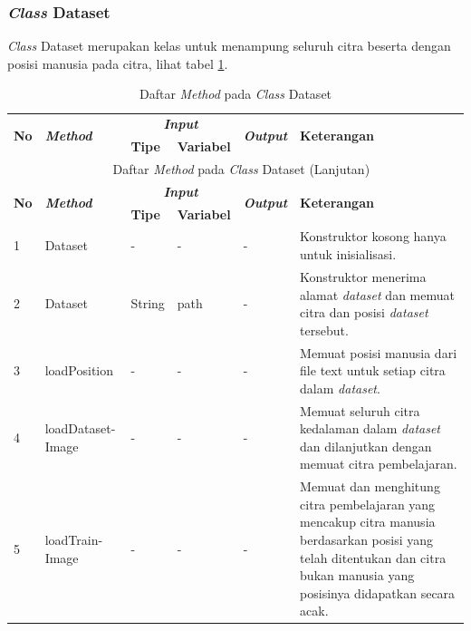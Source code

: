 \subsubsection{\textit{Class} Dataset}
\noindent \textit{Class} Dataset merupakan kelas untuk menampung seluruh citra beserta dengan posisi manusia pada citra, lihat tabel \ref{tbl:classDataset}.
\begingroup
\setlength{\LTleft}{-20cm plus -1fill}
\setlength{\LTright}{\LTleft}
\begin{small}
\begin{longtable}{|p{0.4cm}|p{2cm}|p{1.8cm}|p{1.8cm}|p{1.7cm}|p{3.55cm}|}
	\caption{Daftar \textit{Method} pada \textit{Class} Dataset \label{tbl:classDataset}}\\
	\hline
	\multirow{2}{*}{\textbf{No}} & \multirow{2}{*}{\textit{\textbf{Method}}} & \multicolumn{2}{c|}{\textit{\textbf{Input}}} & \multirow{2}{*}{\textit{\textbf{Output}}} & 
	\multirow{2}{*}{\textbf{Keterangan}}\\
	\cline{3-4}
	& & \textbf{Tipe} & \textbf{Variabel} & & \\
	\endfirsthead
	\multicolumn{6}{c}{\textbf{\tablename~\thetable} Daftar \textit{Method} pada \textit{Class} Dataset (Lanjutan)} \\
	\hline
	\multirow{2}{*}{\textbf{No}} & \multirow{2}{*}{\textit{\textbf{Method}}} & \multicolumn{2}{c|}{\textit{\textbf{Input}}} & \multirow{2}{*}{\textit{\textbf{Output}}} & 
	\multirow{2}{*}{\textbf{Keterangan}}\\
	\cline{3-4}
	& & \textbf{Tipe} & \textbf{Variabel} & & \\
	\endhead
	\hline
	1 & Dataset & - & - & - & Konstruktor kosong hanya untuk inisialisasi.\\
	\hline
	2 & Dataset & String & path & - & Konstruktor menerima alamat \textit{dataset} dan memuat citra dan posisi \textit{dataset} tersebut.\\
	\hline
	3 & loadPosition & - & - & - & Memuat posisi manusia dari file text untuk setiap citra dalam \textit{dataset}.\\
	\hline
	4 & loadDataset-\newline Image & - & - & - & Memuat seluruh citra kedalaman dalam \textit{dataset} dan dilanjutkan dengan memuat citra pembelajaran.\\
	\hline
	5 & loadTrain-\newline Image & - & - & - & Memuat dan menghitung citra pembelajaran yang mencakup citra manusia berdasarkan posisi yang telah ditentukan dan citra bukan manusia yang posisinya didapatkan secara acak.\\

\end{longtable}
\end{small}
